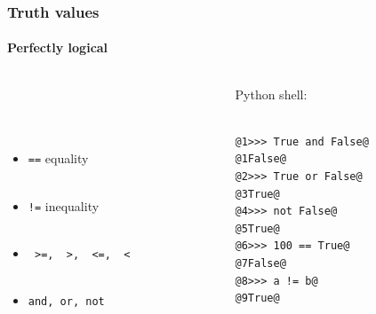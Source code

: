 \documentclass{beamer}
\begin{document}
\begin{frame}[fragile]
\frametitle{Truth values}
\framesubtitle{Perfectly logical}
\large
  \begin{columns}[T]
    \begin{column}{.5\textwidth} 
\ \\ 

\ \\ 


\ \\ 


\begin{itemize}


\item \texttt{==}  equality \\ \
\item  \texttt{!=} inequality \\ \
 \item  \texttt{ >=,~ >,~ <=,~ <}\\ \
 \item  \texttt{and, or, not} \\ \



\end{itemize}
     \end{column}
     
         \begin{column}{.5\textwidth} 
         Python shell: \\ \
\begin{lstlisting}[style=base]
@1>>> True and False@
@1False@
@2>>> True or False@
@3True@
@4>>> not False@
@5True@
@6>>> 100 == True@
@7False@
@8>>> a != b@
@9True@
\end{lstlisting}

    \end{column}
    \end{columns}

\end{frame}
%
\end{document}
